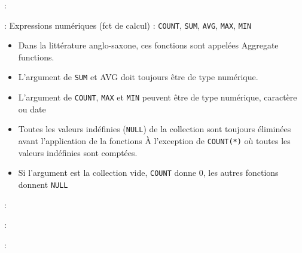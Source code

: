 \documentclass[10pt]{beamer}
\begin{document}
\begin{frame}{\secname : \subsecname}
    
\end{frame}

\begin{frame}[allowframebreaks]{\secname : \subsecname}
    Expressions numériques (fct de calcul) : \lstinline[language=plsql]!COUNT!, \lstinline[language=plsql]!SUM!, \lstinline[language=plsql]!AVG!, \lstinline[language=plsql]!MAX!, \lstinline[language=plsql]!MIN!
    \begin{itemize}
        \item Dans la littérature anglo-saxone, ces fonctions sont appelées Aggregate functions.
        \item L'argument de \lstinline[language=plsql]!SUM! et AVG doit toujours être de type numérique.
        \item L'argument de \lstinline[language=plsql]!COUNT!, \lstinline[language=plsql]!MAX! et \lstinline[language=plsql]!MIN! peuvent être de type numérique, caractère ou date
        \item Toutes les valeurs indéfinies (\lstinline[language=plsql]!NULL!) de la collection sont toujours éliminées avant l'application de la fonctions
              À l'exception de \lstinline[language=plsql]!COUNT(*)! où toutes les valeurs indéfinies sont comptées.
        \item Si l'argument est la collection vide, \lstinline[language=plsql]!COUNT! donne 0, les autres fonctions donnent \lstinline[language=plsql]!NULL!
    \end{itemize}
\end{frame}

\begin{frame}{\secname : \subsecname}
    
\end{frame}

\begin{frame}{\secname : \subsecname}
    
\end{frame}

\begin{frame}{\secname : \subsecname}
    
\end{frame}
\end{document}

